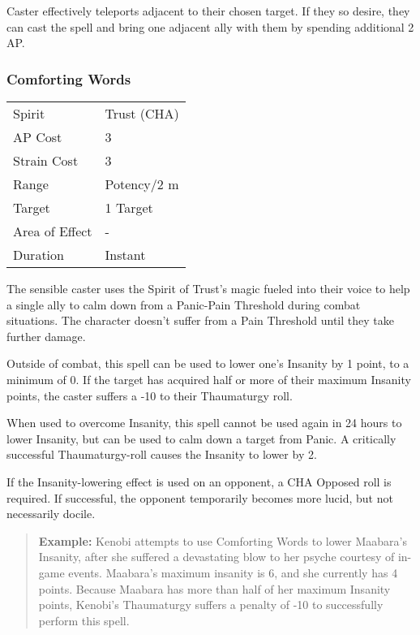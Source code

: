 \documentclass[11pt,a4paper,twocolumn]{book}
\begin{document}
Caster effectively teleports adjacent to their chosen target. If they so desire, they can cast the spell and bring one adjacent ally with them by spending additional 2 AP.







\subsubsection*{Comforting Words}
{
	\begin{tabu} to 75mm{| X[l,4] | X[l,7] |}
		\hline
		Spirit         & Trust (CHA) \\
		AP Cost        & 3           \\
		Strain Cost    & 3           \\
		Range          & Potency/2 m \\
		Target         & 1 Target    \\
		Area of Effect & -           \\
		Duration       & Instant     \\ \hline
	\end{tabu}
	
}

\medskip

The sensible caster uses the Spirit of Trust's magic fueled into their voice to help a single ally to calm down from a Panic-Pain Threshold during combat situations. The character doesn't suffer from a Pain Threshold until they take further damage.

Outside of combat, this spell can be used to lower one's Insanity by 1 point, to a minimum of 0. If the target has acquired half or more of their maximum Insanity points, the caster suffers a -10 to their Thaumaturgy roll.

When used to overcome Insanity, this spell cannot be used again in 24 hours to lower Insanity, but can be used to calm down a target from Panic. A critically successful Thaumaturgy-roll causes the Insanity to lower by 2.

If the Insanity-lowering effect is used on an opponent, a CHA Opposed roll is required. If successful, the opponent temporarily becomes more lucid, but not necessarily docile.

\begin{verse}
	\textbf{Example:} Kenobi attempts to use Comforting Words to lower Maabara's Insanity, after she suffered a devastating blow to her psyche courtesy of in-game events. Maabara's maximum insanity is 6, and she currently has 4 points. Because Maabara has more than half of her maximum Insanity points, Kenobi's Thaumaturgy suffers a penalty of -10 to successfully perform this spell.
\end{verse}
\end{document}
